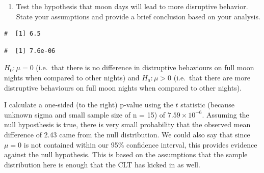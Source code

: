 \documentclass[letterpaper,11pt,twoside,]{pinp}
\providecommand{\tightlist}{%
  \setlength{\itemsep}{0pt}\setlength{\parskip}{0pt}}
\begin{document}
\begin{enumerate}
\def\labelenumi{\alph{enumi}.}
\setcounter{enumi}{1}
\tightlist
\item
  Test the hypothesis that moon days will lead to more disruptive
  behavior. State your assumptions and provide a brief conclusion based
  on your analysis.
\end{enumerate}

\begin{Shaded}
\begin{Highlighting}[]
\OtherTok{\textless{}{-}}\SpecialCharTok{{-}} \NormalTok{) }\SpecialCharTok{/}\SpecialCharTok{/}
\end{Highlighting}
\end{Shaded}

\begin{ShadedResult}
\begin{verbatim}
#  [1] 6.5
\end{verbatim}
\end{ShadedResult}

\begin{Shaded}
\begin{Highlighting}[]
\NormalTok{(}\NormalTok{, }
\end{Highlighting}
\end{Shaded}

\begin{ShadedResult}
\begin{verbatim}
#  [1] 7.6e-06
\end{verbatim}
\end{ShadedResult}

\(H_0: \mu = 0\) (i.e.~that there is no difference in distruptive
behaviours on full moon nights when compared to other nights) and
\(H_a: \mu > 0\) (i.e.~that there are more distruptive behaviours on
full moon nights when compared to other nights).

I calculate a one-sided (to the right) p-value using the \(t\) statistic
(because unknown sigma and small sample size of n = 15) of
\ensuremath{7.59\times 10^{-6}}. Assuming the null hyposthesis is true,
there is very small probability that the observed mean difference of
2.43 came from the null distribution. We could also say that since
\(\mu = 0\) is not contained within our 95\% confidence interval, this
provides evidence against the null hypothesis. This is based on the
assumptions that the sample distribution here is enough that the CLT has
kicked in as well.
\end{document}
